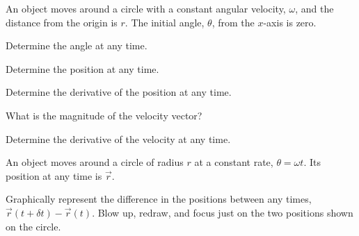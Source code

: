 
\begin{problem}
\item An object moves around a circle with a constant angular
  velocity, $\omega$, and the distance from the origin is $r$. The
  initial angle, $\theta$, from the $x$-axis is zero.
  \begin{subproblem}
  \item Determine the angle at any time.
    \vfill
  \item Determine the position at any time.
    \vfill
  \item Determine the derivative of the position at any time.
    \vfill
  \item What is the magnitude of the velocity vector?
    \vfill
  \item Determine the derivative of the velocity at any time.
    \vfill
  \end{subproblem}

  \clearpage

\item An object moves around a circle of radius $r$  at a constant
  rate, $\theta=\omega t$. Its position at any time is $\vec{r}$.

  \begin{subproblem}
  \item Graphically represent the difference in the positions between
    any times, $\vec{r}(t+\delta t)-\vec{r}(t)$. Blow up, redraw, and
    focus just on the two positions shown on the circle.

    \vfill


\end{subproblem}
\end{problem}

